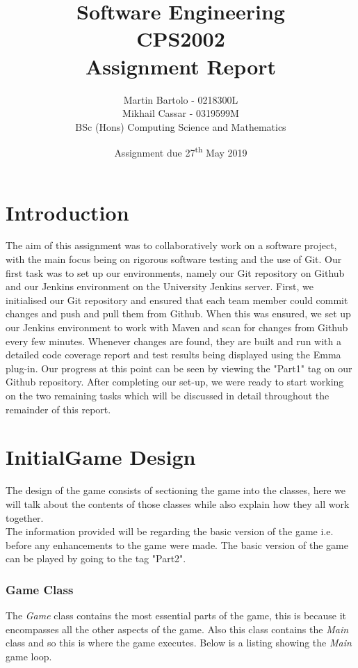 \documentclass[a4paper,12pt]{extarticle}
\title{\textbf{Software Engineering\\\vspace{5mm} CPS2002\\\vspace{5mm}  Assignment Report}}
\author{\LARGE Martin Bartolo - 0218300L\vspace{1mm}\\ \LARGE Mikhail Cassar - 0319599M\vspace{3mm}\\ \large BSc (Hons) Computing Science and Mathematics}
\date{Assignment due 27\textsuperscript{th} May 2019}
\begin{document}
\setlength{\parindent}{10pt}
\setlength{\footskip}{50pt}

\maketitle
\thispagestyle{empty}
\newpage

\tableofcontents
\newpage

\section{Introduction}
The aim of this assignment was to collaboratively work on a software project, with the main focus being on rigorous software testing and the use of Git. Our first task was to set up our environments, namely our Git repository on Github and our Jenkins environment on the University Jenkins server. First, we initialised our Git repository and ensured that each team member could commit changes and push and pull them from Github. When this was ensured, we set up our Jenkins environment to work with Maven and scan for changes from Github every few minutes. Whenever changes are found, they are built and run with a detailed code coverage report and test results being displayed using the Emma plug-in. Our progress at this point can be seen by viewing the "Part1" tag on our Github repository. After completing our set-up, we were ready to start working on the two remaining tasks which will be discussed in detail throughout the remainder of this report.
\newpage

\section{InitialGame Design}
\noindent The design of the game consists of sectioning the game into the classes, here we will talk about the contents of those classes while also explain how they all work together.\\

\noindent The information provided will be regarding the basic version of the game i.e. before any enhancements to the game were made. The basic version of the game can be played by going to the tag "Part2".

\subsubsection{Game Class}

\noindent The \textit{Game} class contains the most essential parts of the game, this is because it encompasses all the other aspects of the game. Also this class contains the \textit{Main} class and so this is where the game executes. Below is a listing showing the \textit{Main} game loop.
\end{document}
